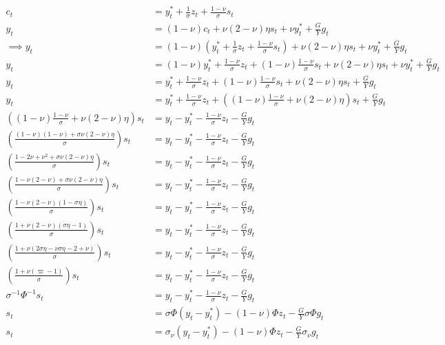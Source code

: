\begin{align}
    c_t & = y^*_t + \frac{1}{\sigma}z_t + \frac{1-\nu}{\sigma}s_t\\
    y_t &= (1-\nu)c_t + \nu (2-\nu)\eta s_t + \nu y^*_t + \frac{G}{Y} g_t\\
    \implies y_t &= (1-\nu)\left( y^*_t + \frac{1}{\sigma}z_t + \frac{1-\nu}{\sigma}s_t \right) + \nu (2-\nu)\eta s_t + \nu y^*_t + \frac{G}{Y} g_t\\
    y_t &= (1-\nu)y^*_t + \frac{1-\nu}{\sigma}z_t + (1-\nu)\frac{1-\nu}{\sigma}s_t + \nu (2-\nu)\eta s_t + \nu y^*_t + \frac{G}{Y} g_t\\
    y_t &= y^*_t + \frac{1-\nu}{\sigma}z_t + (1-\nu)\frac{1-\nu}{\sigma}s_t + \nu (2-\nu)\eta s_t + \frac{G}{Y} g_t\\
    y_t &= y^*_t + \frac{1-\nu}{\sigma}z_t + \left((1-\nu)\frac{1-\nu}{\sigma} + \nu (2-\nu)\eta \right) s_t + \frac{G}{Y} g_t\\
    \left((1-\nu)\frac{1-\nu}{\sigma} + \nu (2-\nu)\eta \right) s_t &= y_t - y^*_t - \frac{1-\nu}{\sigma}z_t - \frac{G}{Y} g_t\\
    \left(\frac{(1-\nu)(1-\nu) + \sigma\nu (2-\nu)\eta}{\sigma} \right) s_t &= y_t - y^*_t - \frac{1-\nu}{\sigma}z_t - \frac{G}{Y} g_t\\
    \left(\frac{1 -2\nu + \nu^2 + \sigma\nu (2-\nu)\eta}{\sigma} \right) s_t &= y_t - y^*_t - \frac{1-\nu}{\sigma}z_t - \frac{G}{Y} g_t\\
    \left(\frac{1 - \nu (2-\nu) + \sigma\nu (2-\nu)\eta}{\sigma} \right) s_t &= y_t - y^*_t - \frac{1-\nu}{\sigma}z_t - \frac{G}{Y} g_t\\
    \left(\frac{1 - \nu (2-\nu)(1-\sigma \eta)}{\sigma} \right) s_t &= y_t - y^*_t - \frac{1-\nu}{\sigma}z_t - \frac{G}{Y} g_t\\
    \left(\frac{1 + \nu (2-\nu)(\sigma \eta - 1)}{\sigma} \right) s_t &= y_t - y^*_t - \frac{1-\nu}{\sigma}z_t - \frac{G}{Y} g_t\\
    \left(\frac{1 + \nu (2\sigma \eta-\nu\sigma \eta -2 + \nu)}{\sigma} \right) s_t &= y_t - y^*_t - \frac{1-\nu}{\sigma}z_t - \frac{G}{Y} g_t\\
    \left(\frac{1 + \nu (\varpi - 1)}{\sigma} \right) s_t &= y_t - y^*_t - \frac{1-\nu}{\sigma}z_t - \frac{G}{Y} g_t\\
    \sigma^{-1} \Phi^{-1} s_t &= y_t - y^*_t - \frac{1-\nu}{\sigma}z_t - \frac{G}{Y} g_t\\
    s_t &= \sigma \Phi(y_t - y^*_t) - (1-\nu)\Phi z_t - \frac{G}{Y} \sigma \Phi g_t\\
    s_t &= \sigma_\nu(y_t - y^*_t) - (1-\nu)\Phi z_t - \frac{G}{Y} \sigma_\nu g_t\\
\end{align}
